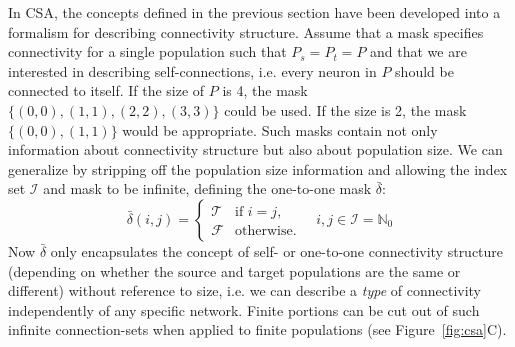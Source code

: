 \documentclass{frontiersSCNS} %
\newcommand{\Figure}[2]{Figure~\ref{#2}}
\newcommand{\Figure}[2]{Figure~#1}
\begin{document}
In CSA, the concepts defined in the previous section have been
developed into a formalism for describing connectivity structure.
Assume that a mask specifies connectivity for a single population
such that $P_s = P_t = P$ and that we are interested in describing
self-connections, i.e. every neuron in $P$ should be connected to
itself.  If the size of $P$ is 4, the mask $\{(0, 0), (1, 1), (2, 2),
(3, 3)\}$ could be used.  If the size is 2, the mask $\{(0, 0), (1,
1)\}$ would be appropriate. Such masks contain not only information
about connectivity structure but also about population size. We can
generalize by stripping off the population size information and
allowing the index set $\mathcal{I}$ and mask to be infinite, defining
the one-to-one mask $\bar{\delta}$:
\begin{equation}
  \bar{\delta}(i, j) =
      \begin{cases}
        \mathcal{T}& \text{if $i = j$},\\
        \mathcal{F}& \text{otherwise}.
      \end{cases}
      \quad i, j \in \mathcal{I} = \mathbb{N}_0
\end{equation}
Now $\bar{\delta}$ only encapsulates the concept of self- or
one-to-one connectivity structure (depending on whether the source and
target populations are the same or different) without reference to
size, i.e. we can describe a
\emph{type} of connectivity independently of any specific network.  Finite
portions can be cut out of such infinite connection-sets when applied
to finite populations (see \Figure{1}{fig:csa}C).
\end{document}
